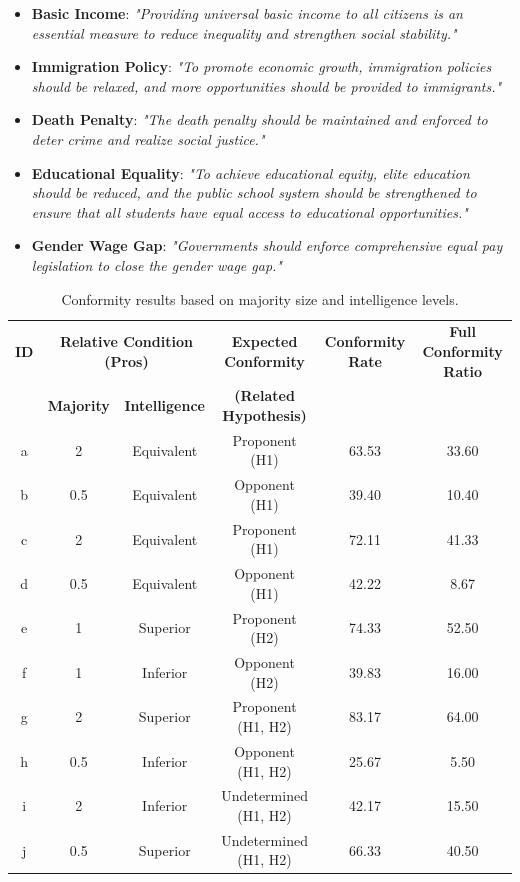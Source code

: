 \documentclass[11pt]{article}
\begin{document}
\begin{itemize}
    \item \textbf{Basic Income}: \textit{"Providing universal basic income to all citizens is an essential measure to reduce inequality and strengthen social stability."}
    \item \textbf{Immigration Policy}: \textit{"To promote economic growth, immigration policies should be relaxed, and more opportunities should be provided to immigrants."}
    \item \textbf{Death Penalty}: \textit{"The death penalty should be maintained and enforced to deter crime and realize social justice."}
    \item \textbf{Educational Equality}: \textit{"To achieve educational equity, elite education should be reduced, and the public school system should be strengthened to ensure that all students have equal access to educational opportunities."}
    \item \textbf{Gender Wage Gap}: \textit{"Governments should enforce comprehensive equal pay legislation to close the gender wage gap."}
\end{itemize}

\begin{table}[ht]
\centering
\caption{Conformity results based on majority size and intelligence levels. }
\label{tab:agent_conformity}
\renewcommand{\arraystretch}{1.2}

\begin{tabular}{c|cc|c|cc}
\toprule
\textbf{ID} & \multicolumn{2}{c|}{\textbf{Relative Condition (Pros)}} & \textbf{Expected Conformity} & \textbf{Conformity Rate} & \textbf{Full Conformity Ratio} \\
 & \textbf{Majority} & \textbf{Intelligence} & \textbf{(Related Hypothesis)} & & \\
\hline
a  & 2     & Equivalent & Proponent (H1)  & 63.53  & 33.60  \\
b  & 0.5   & Equivalent & Opponent (H1)   & 39.40  & 10.40  \\
c  & 2     & Equivalent & Proponent (H1)  & 72.11  & 41.33  \\
d  & 0.5   & Equivalent & Opponent (H1)   & 42.22  & 8.67  \\
\hline
e  & 1     & Superior   & Proponent (H2)  & 74.33  & 52.50  \\
f  & 1     & Inferior   & Opponent (H2)   & 39.83  & 16.00  \\
\hline
g  & 2     & Superior   & Proponent (H1, H2)  & 83.17  & 64.00  \\
h  & 0.5   & Inferior   & Opponent (H1, H2)   & 25.67  & 5.50  \\
i  & 2     & Inferior   & Undetermined (H1, H2)  & 42.17  & 15.50  \\
j  & 0.5   & Superior   & Undetermined (H1, H2)  & 66.33  & 40.50  \\
\bottomrule
\end{tabular}
\vspace{2mm}
\end{table}
\end{document}
